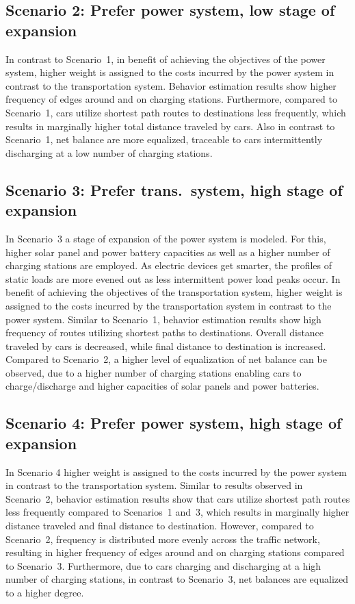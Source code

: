 \subsection*{Scenario 2: Prefer power system, low stage of expansion}

In contrast to Scenario~1, in benefit of achieving the objectives of the power system, higher weight is assigned to the costs incurred by the power system in contrast to the transportation system. Behavior estimation results show higher frequency of edges around and on charging stations. Furthermore, compared to Scenario~1, cars utilize shortest path routes to destinations less frequently, which results in marginally higher total distance traveled by cars. Also in contrast to Scenario~1, net balance are more equalized, traceable to cars intermittently discharging at a low number of charging stations.

\subsection*{Scenario 3: Prefer trans.\ system, high stage of expansion}

In Scenario~3 a stage of expansion of the power system is modeled. For this, higher solar panel and power battery capacities as well as a higher number of charging stations are employed. As electric devices get smarter, the profiles of static loads are more evened out as less intermittent power load peaks occur. In benefit of achieving the objectives of the transportation system, higher weight is assigned to the costs incurred by the transportation system in contrast to the power system. Similar to Scenario~1, behavior estimation results show high frequency of routes utilizing shortest paths to destinations. Overall distance traveled by cars is decreased, while final distance to destination is increased. Compared to Scenario~2, a higher level of equalization of net balance can be observed, due to a higher number of charging stations enabling cars to charge/discharge and higher capacities of solar panels and power batteries.

\subsection*{Scenario 4: Prefer power system, high stage of expansion}

In Scenario 4 higher weight is assigned to the costs incurred by the power system in contrast to the transportation system. Similar to results observed in Scenario~2, behavior estimation results show that cars utilize shortest path routes less frequently compared to Scenarios~1 and~3, which results in marginally higher distance traveled and final distance to destination. However, compared to Scenario~2, frequency is distributed more evenly across the traffic network, resulting in higher frequency of edges around and on charging stations compared to Scenario~3. Furthermore, due to cars charging and discharging at a high number of charging stations, in contrast to Scenario~3, net balances are equalized to a higher degree.